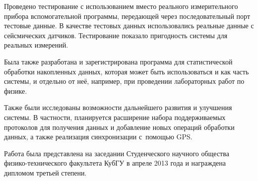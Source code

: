 \documentclass[a4paper, 14pt, titlepage]{extarticle}
\begin{document}
  Проведено тестирование с использованием вместо реального измерительного прибора вспомогательной
  программы, передающей через последовательный порт тестовые данные. В качестве тестовых данных
  использовались реальные данные с сейсмических датчиков. Тестирование показало пригодность системы
  для реальных измерений.

  Была также разработана и зарегистрирована программа для статистической обработки накопленных
  данных, которая может быть использоваться и как часть системы, и отдельно от неё, например, при
  проведении лабораторных работ по физике.

  Также были исследованы возможности дальнейшего развития и улучшения системы. В частности,
  планируется расширение набора поддерживаемых протоколов для получения данных и добавление новых
  операций обработки данных, а также реализация синхронизации с~помощью GPS.

  Работа была представлена на заседании Студенческого научного общества физико-технического факультета
  КубГУ в апреле 2013 года и награждена дипломом третьей степени.

  \begin{flushleft}
    
  \end{flushleft}
\end{document}
